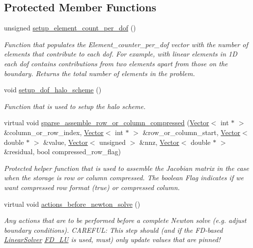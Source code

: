\subsection*{Protected Member Functions}
\begin{DoxyCompactItemize}
\item 
unsigned \hyperlink{classoomph_1_1Problem_a919a5f4752362df6005d24e51b5780e0}{setup\+\_\+element\+\_\+count\+\_\+per\+\_\+dof} ()
\begin{DoxyCompactList}\small\item\em Function that populates the Element\+\_\+counter\+\_\+per\+\_\+dof vector with the number of elements that contribute to each dof. For example, with linear elements in 1D each dof contains contributions from two elements apart from those on the boundary. Returns the total number of elements in the problem. \end{DoxyCompactList}\item 
void \hyperlink{classoomph_1_1Problem_a216679e2a976e0205165bbe7ab558579}{setup\+\_\+dof\+\_\+halo\+\_\+scheme} ()
\begin{DoxyCompactList}\small\item\em Function that is used to setup the halo scheme. \end{DoxyCompactList}\item 
virtual void \hyperlink{classoomph_1_1Problem_a072f2894b20672be1a48783684c4a50b}{sparse\+\_\+assemble\+\_\+row\+\_\+or\+\_\+column\+\_\+compressed} (\hyperlink{classoomph_1_1Vector}{Vector}$<$ int $\ast$ $>$ \&column\+\_\+or\+\_\+row\+\_\+index, \hyperlink{classoomph_1_1Vector}{Vector}$<$ int $\ast$ $>$ \&row\+\_\+or\+\_\+column\+\_\+start, \hyperlink{classoomph_1_1Vector}{Vector}$<$ double $\ast$ $>$ \&value, \hyperlink{classoomph_1_1Vector}{Vector}$<$ unsigned $>$ \&nnz, \hyperlink{classoomph_1_1Vector}{Vector}$<$ double $\ast$ $>$ \&residual, bool compressed\+\_\+row\+\_\+flag)
\begin{DoxyCompactList}\small\item\em Protected helper function that is used to assemble the Jacobian matrix in the case when the storage is row or column compressed. The boolean Flag indicates if we want compressed row format (true) or compressed column. \end{DoxyCompactList}\item 
virtual void \hyperlink{classoomph_1_1Problem_a0c8d70891f7369bb4bf8412fa1a08ecb}{actions\+\_\+before\+\_\+newton\+\_\+solve} ()
\begin{DoxyCompactList}\small\item\em Any actions that are to be performed before a complete Newton solve (e.\+g. adjust boundary conditions). C\+A\+R\+E\+F\+UL\+: This step should (and if the F\+D-\/based \hyperlink{classoomph_1_1LinearSolver}{Linear\+Solver} \hyperlink{classoomph_1_1FD__LU}{F\+D\+\_\+\+LU} is used, must) only update values that are pinned! \end{DoxyCompactList}\item 

\end{DoxyCompactItemize}

